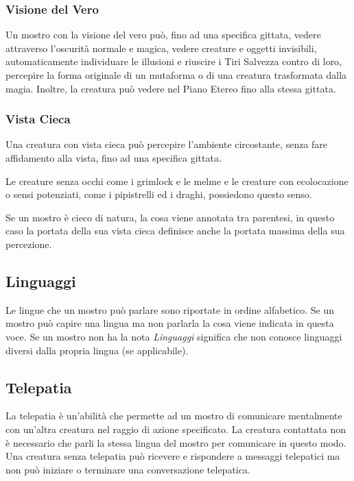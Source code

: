 \begin{multicols}{2}
\subsubsection{Visione del Vero}

Un mostro con la visione del vero può, fino ad una specifica gittata, vedere attraverso l'oscurità normale e magica, vedere creature e oggetti invisibili, automaticamente individuare le illusioni e riuscire i Tiri Salvezza contro di loro, percepire la forma originale di un mutaforma o di una creatura trasformata dalla magia. Inoltre, la creatura può vedere nel Piano Etereo fino alla stessa gittata.

\subsubsection{Vista Cieca}

Una creatura con vista cieca può percepire l'ambiente circostante, senza fare affidamento alla vista, fino ad una specifica gittata.

Le creature senza occhi come i grimlock e le melme e le creature con ecolocazione o sensi potenziati, come i pipistrelli ed i draghi, possiedono questo senso.

Se un mostro è cieco di natura, la cosa viene annotata tra parentesi, in questo caso la portata della sua vista cieca definisce anche la portata massima della sua percezione.


\subsection{Linguaggi}

Le lingue che un mostro può parlare sono riportate in ordine alfabetico. Se un mostro può capire una lingua ma non parlarla la cosa viene indicata in questa voce. Se un mostro non ha la nota \emph{Linguaggi} significa che non conosce linguaggi diversi dalla propria lingua (se applicabile).

\subsection{Telepatia}

La telepatia è un'abilità che permette ad un mostro di comunicare mentalmente con un'altra creatura nel raggio di azione specificato. La creatura contattata non è necessario che parli la stessa lingua del mostro per comunicare in questo modo. Una creatura senza telepatia può ricevere e rispondere a messaggi telepatici ma non può iniziare o terminare una conversazione telepatica.


\end{multicols}
